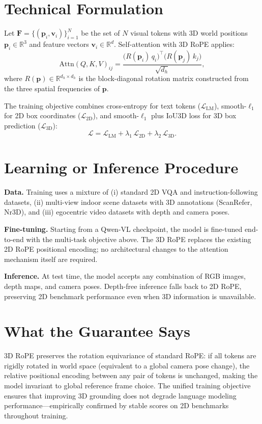 \documentclass[10pt,twocolumn]{article}
\begin{document}
\section{Technical Formulation}

Let $\mathbf{F} = \{(\mathbf{p}_i, \mathbf{v}_i)\}_{i=1}^N$ be the set of $N$ visual
tokens with 3D world positions $\mathbf{p}_i \in \mathbb{R}^3$ and feature vectors
$\mathbf{v}_i \in \mathbb{R}^d$. Self-attention with 3D RoPE applies:
\[
\mathrm{Attn}(Q, K, V)_{ij}
= \frac{\bigl(R(\mathbf{p}_i)\,q_i\bigr)^{\!\top}
         \bigl(R(\mathbf{p}_j)\,k_j\bigr)}{\sqrt{d_h}},
\]
where $R(\mathbf{p}) \in \mathbb{R}^{d_h \times d_h}$ is the block-diagonal rotation
matrix constructed from the three spatial frequencies of $\mathbf{p}$.

The training objective combines cross-entropy for text tokens ($\mathcal{L}_\text{LM}$),
smooth-$\ell_1$ for 2D box coordinates ($\mathcal{L}_\text{2D}$), and smooth-$\ell_1$
plus IoU3D loss for 3D box prediction ($\mathcal{L}_\text{3D}$):
\[
\mathcal{L} = \mathcal{L}_\text{LM} + \lambda_1\,\mathcal{L}_\text{2D}
              + \lambda_2\,\mathcal{L}_\text{3D}.
\]

\section{Learning or Inference Procedure}

\textbf{Data.} Training uses a mixture of (i) standard 2D VQA and instruction-following
datasets, (ii) multi-view indoor scene datasets with 3D annotations (ScanRefer, Nr3D),
and (iii) egocentric video datasets with depth and camera poses.

\textbf{Fine-tuning.} Starting from a Qwen-VL checkpoint, the model is fine-tuned
end-to-end with the multi-task objective above. The 3D RoPE replaces the existing 2D
RoPE positional encoding; no architectural changes to the attention mechanism itself
are required.

\textbf{Inference.} At test time, the model accepts any combination of RGB images,
depth maps, and camera poses. Depth-free inference falls back to 2D RoPE, preserving
2D benchmark performance even when 3D information is unavailable.

\section{What the Guarantee Says}

3D RoPE preserves the rotation equivariance of standard RoPE: if all tokens are
rigidly rotated in world space (equivalent to a global camera pose change), the
relative positional encoding between any pair of tokens is unchanged, making the model
invariant to global reference frame choice. The unified training objective ensures that
improving 3D grounding does not degrade language modeling performance---empirically
confirmed by stable scores on 2D benchmarks throughout training.
\end{document}
